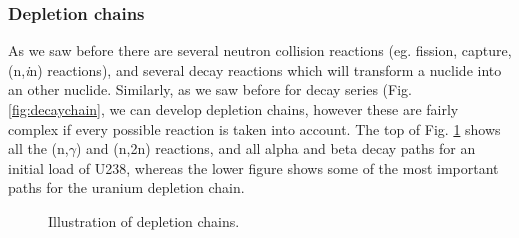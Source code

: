 \subsubsection{Depletion chains}

As we saw before there are several neutron collision reactions (eg. fission, capture, (n,\textit{i}n) reactions), and several decay reactions which will transform a nuclide into an other nuclide. Similarly, as we saw before for decay series (Fig. \ref{fig:decaychain}, we can develop depletion chains, however these are fairly complex if every possible reaction is taken into account. The top of Fig. \ref{fig:depletionchain} shows all the (n,$\gamma$) and (n,2n) reactions, and all alpha and beta decay paths for an initial load of U238, whereas the lower figure shows some of the most important paths for the uranium depletion chain.

\begin{figure}[ht!]
\protect {}\protect
\caption{\label{fig:depletionchain} \footnotesize{Illustration of depletion chains.}}
\end{figure}

